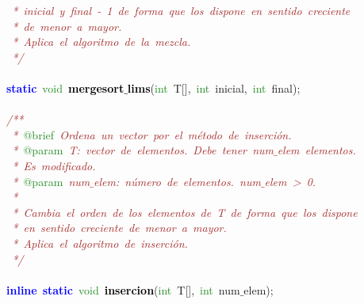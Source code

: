 \mbox{}\textit{\textcolor{Brown}{\ *\ inicial\ y\ final\ -\ 1\ de\ forma\ que\ los\ dispone\ en\ sentido\ creciente}} \\
\mbox{}\textit{\textcolor{Brown}{\ *\ de\ menor\ a\ mayor.}} \\
\mbox{}\textit{\textcolor{Brown}{\ *\ Aplica\ el\ algoritmo\ de\ la\ mezcla.}} \\
\mbox{}\textit{\textcolor{Brown}{\ */}} \\
\mbox{} \\
\mbox{}\textbf{\textcolor{Blue}{static}}\ \textcolor{ForestGreen}{void}\ \textbf{\textcolor{Black}{mergesort$\_$lims}}\textcolor{BrickRed}{(}\textcolor{ForestGreen}{int}\ T\textcolor{BrickRed}{[],}\ \textcolor{ForestGreen}{int}\ inicial\textcolor{BrickRed}{,}\ \textcolor{ForestGreen}{int}\ final\textcolor{BrickRed}{);} \\
\mbox{} \\
\mbox{}\textit{\textcolor{Brown}{/**}} \\
\mbox{}\textit{\textcolor{Brown}{\ *\ }}\textcolor{ForestGreen}{@brief}\textit{\textcolor{Brown}{\ Ordena\ un\ vector\ por\ el\ método\ de\ inserción.}} \\
\mbox{}\textit{\textcolor{Brown}{\ *\ }}\textcolor{ForestGreen}{@param}\textit{\textcolor{Brown}{\ T:\ vector\ de\ elementos.\ Debe\ tener\ num$\_$elem\ elementos.}} \\
\mbox{}\textit{\textcolor{Brown}{\ *\ Es\ modificado.}} \\
\mbox{}\textit{\textcolor{Brown}{\ *\ }}\textcolor{ForestGreen}{@param}\textit{\textcolor{Brown}{\ num$\_$elem:\ número\ de\ elementos.\ num$\_$elem\ \textgreater{}\ 0.}} \\
\mbox{}\textit{\textcolor{Brown}{\ *\ }} \\
\mbox{}\textit{\textcolor{Brown}{\ *\ Cambia\ el\ orden\ de\ los\ elementos\ de\ T\ de\ forma\ que\ los\ dispone}} \\
\mbox{}\textit{\textcolor{Brown}{\ *\ en\ sentido\ creciente\ de\ menor\ a\ mayor.}} \\
\mbox{}\textit{\textcolor{Brown}{\ *\ Aplica\ el\ algoritmo\ de\ inserción.}} \\
\mbox{}\textit{\textcolor{Brown}{\ */}} \\
\mbox{} \\
\mbox{}\textbf{\textcolor{Blue}{inline}}\ \textbf{\textcolor{Blue}{static}}\ \textcolor{ForestGreen}{void}\ \textbf{\textcolor{Black}{insercion}}\textcolor{BrickRed}{(}\textcolor{ForestGreen}{int}\ T\textcolor{BrickRed}{[],}\ \textcolor{ForestGreen}{int}\ num$\_$elem\textcolor{BrickRed}{);} \\
